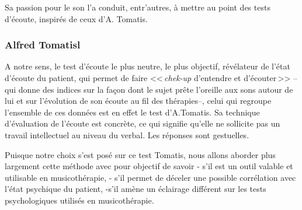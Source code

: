 Sa passion pour le son l'a conduit, entr'autres, à mettre au point des tests
d'écoute, inspirés de ceux d'A. Tomatis.
       
\subsubsection{Alfred Tomatisl}


A notre sens, le  test d'écoute le plus neutre, le plus objectif, révélateur de l'état d'écoute
du patient, qui permet de faire <<\,\emph{chek-up} d'entendre et d'écouter\,>>
 --qui donne des indices sur la façon dont le sujet prête l'oreille
 aux sons autour de lui et sur l'évolution de son écoute au fil des thérapies--,
celui qui regroupe l'ensemble de ces
données est en effet le test d'A.Tomatis.
Sa technique d'évaluation
de l'écoute est concrète, ce qui signifie qu'elle ne
sollicite pas un travail intellectuel au niveau du verbal.
Les réponses sont gestuelles.

Puisque notre choix s'est posé sur ce test Tomatis, nous allons
aborder plus largement cette méthode avec pour objectif de savoir
- s'il est un outil valable et utilisable en musicothérapie,
- s'il permet de déceler une possible corrélation avec l'état
psychique du patient,
-s'il amène un éclairage différent sur les tests psychologiques
utilisés en musicothérapie.
